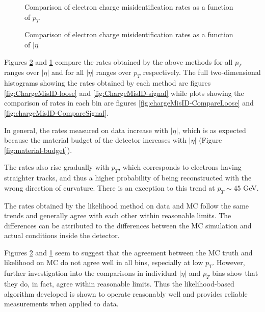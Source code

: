 \begin{figure}[h!]
\centering
{}
\caption{Comparison of electron charge misidentification rates as a function of $p_T$}
\label{fig:rates-pt}
\end{figure}

\begin{figure}[h!]
\centering
{}
\caption{Comparison of electron charge misidentification rates as a function of $|\eta|$}
\label{fig:rates-eta}
\end{figure}



Figures \ref{fig:rates-eta} and \ref{fig:rates-pt} compare the rates  obtained by the above methods for all $p_T$ ranges over $|\eta|$ and for all $|\eta|$ ranges over $p_T$ respectively. The full two-dimensional histograms showing the rates obtained by each method are figures \ref{fig:ChargeMisID-loose} and \ref{fig:ChargeMisID-signal} while plots showing the comparison of rates in each bin are figures \ref{fig:chargeMisID-CompareLoose} and \ref{fig:chargeMisID-CompareSignal}.

In general, the rates measured on data increase with $|\eta|$, which is as expected because the material budget of the detector increases with $|\eta|$ (Figure \ref{fig:material-budget}). 

The rates also rise gradually with $p_T$, which corresponds to electrons having straighter tracks, and thus a higher probability of being reconstructed with the wrong direction of curvature. There is an exception to this trend at $p_T\sim45$ GeV.

The rates obtained by the likelihood method on data and MC follow the same trends and generally agree with each other within reasonable limits. The differences can be attributed to the differences between the MC simulation and actual conditions inside the detector.

Figures \ref{fig:rates-eta} and \ref{fig:rates-pt} seem to suggest that the agreement between the MC truth and likelihood on MC do not agree well in all bins, especially at low $p_T$. However, further investigation into the comparisons in individual $|\eta|$ and $p_T$ bins show that they do, in fact, agree within reasonable limits. Thus the likelihood-based algorithm developed is shown to operate reasonably well and  provides reliable measurements when applied to data.

